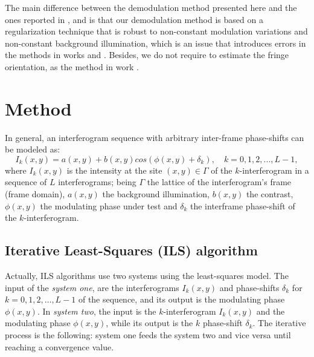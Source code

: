 \documentclass[letterpaper,12pt]{article}   %
\begin{document}
The main difference between the demodulation method presented here and
the ones reported in \cite{a14},\cite{a15} and \cite{a17} is that our
demodulation method is based on a regularization technique that is
robust to non-constant modulation variations and non-constant
background illumination, which is an issue that introduces errors in
the methods in works \cite{a14} and \cite{a15}. Besides, we do not
require to estimate the fringe orientation, as the method in work
\cite{a17}.

\section{Method}

In general, an interferogram sequence with arbitrary inter-frame
phase-shifts can be modeled as:
\begin{equation} \label{eq:I_k1}
  I_k(x,y)=a(x,y)+b(x,y)cos(\phi(x,y)+\delta_k),\quad k=0,1,2,...,L-1,
\end{equation}
where $I_k(x,y)$ is the intensity at the site $(x,y)\in\Gamma$ of the
$k$-interferogram in a sequence of $L$ interferograms; being $\Gamma$
the lattice of the interferogram's frame (frame domain), $a(x,y)$ the
background illumination, $b(x,y)$ the contrast, $\phi(x,y)$ the
modulating phase under test and $\delta_k$ the interframe phase-shift
of the $k$-interferogram.

\subsection{Iterative Least-Squares (ILS) algorithm}
Actually, ILS algorithms use two systems using the least-squares
model. The input of the \emph{system one}, are the interferograms
$I_k(x,y)$ and phase-shifts $\delta_k$ for $k=0,1,2,\dots,L-1$ of the
sequence, and its output is the modulating phase $\phi(x,y)$. In
\emph{system two}, the input is the $k$-interferogram $I_k(x,y)$ and
the modulating phase $\phi(x,y)$, while its output is the $k$
phase-shift $\delta_k$. The iterative process is the following: system
one feeds the system two and vice versa until reaching a convergence
value.
\end{document}
